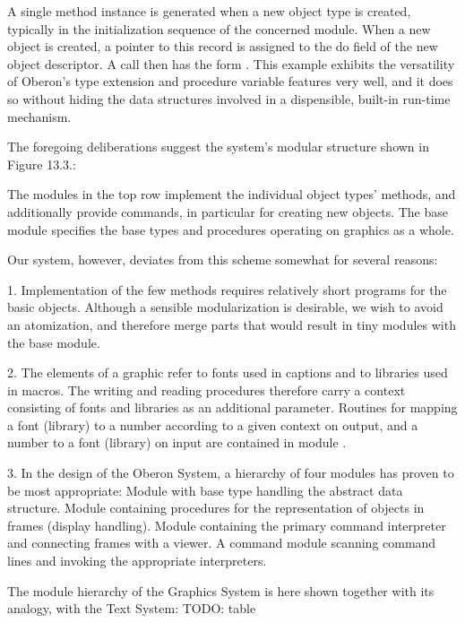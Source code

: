 A single method instance is generated when a new object type is created, typically in the initialization sequence of the concerned module. When a new object is created, a pointer to this record is assigned to the do field of the new object descriptor. A call then has the form . This example exhibits the versatility of Oberon's type extension and procedure variable features very well, and it does so without hiding the data structures involved in a dispensible, built-in run-time mechanism.

The foregoing deliberations suggest the system's modular structure shown in Figure 13.3.:


The modules in the top row implement the individual object types' methods, and additionally provide commands, in particular  for creating new objects. The base module specifies the base types and procedures operating on graphics as a whole.

Our system, however, deviates from this scheme somewhat for several reasons:

\item{1.} Implementation of the few methods requires relatively short programs for the basic objects. Although a sensible modularization is desirable, we wish to avoid an atomization, and therefore merge parts that would result in tiny modules with the base module.
\item{2.} The elements of a graphic refer to fonts used in captions and to libraries used in macros. The writing and reading procedures therefore carry a context consisting of fonts and libraries as an additional parameter. Routines for mapping a font (library) to a number according to a given context on output, and a number to a font (library) on input are contained in module .
\item{3.} In the design of the Oberon System, a hierarchy of four modules has proven to be most appropriate:
 Module with base type handling the abstract data structure.
 Module containing procedures for the representation of objects in frames (display handling).
 Module containing the primary command interpreter and connecting frames with a viewer.
 A command module scanning command lines and invoking the appropriate interpreters.

The module hierarchy of the Graphics System is here shown together with its analogy, with the Text System:
TODO: table

